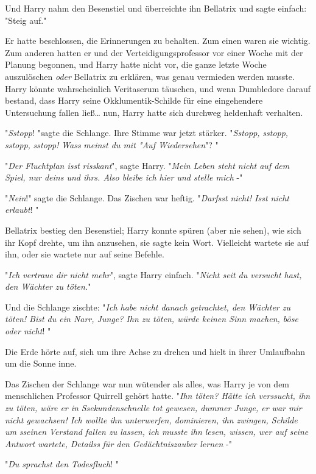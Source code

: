 {Und Harry nahm den Besenstiel und überreichte ihn Bellatrix und sagte einfach: "Steig auf."

Er hatte beschlossen, die Erinnerungen zu behalten. Zum einen waren sie wichtig. Zum anderen hatten er und der Verteidigungsprofessor vor einer Woche mit der Planung begonnen, und Harry hatte nicht vor, die ganze letzte Woche auszulöschen \emph{oder} Bellatrix zu erklären, was genau vermieden werden musste. Harry könnte wahrscheinlich Veritaserum täuschen, und wenn Dumbledore darauf bestand, dass Harry seine Okklumentik-Schilde für eine eingehendere Untersuchung fallen ließ… nun, Harry hatte sich durchweg heldenhaft verhalten.

"\emph{Sstopp}! "sagte die Schlange. Ihre Stimme war jetzt stärker. "\emph{Sstopp,} \emph{sstopp,} \emph{sstopp,} \emph{sstopp!} \emph{Wass} \emph{meinst du mit "Auf Wiedersehen}"? "

"\emph{Der Fluchtplan isst} \emph{risskant}", sagte Harry. "\emph{Mein Leben steht nicht auf dem Spiel, nur deins und ihrs. Also bleibe ich hier und stelle mich} -"

"\emph{Nein}!" sagte die Schlange. Das Zischen war heftig. "\emph{Darfsst} \emph{nicht! Isst nicht erlaubt}! "

Bellatrix bestieg den Besenstiel; Harry konnte spüren (aber nie sehen), wie sich ihr Kopf drehte, um ihn anzusehen, sie sagte kein Wort. Vielleicht wartete sie auf ihn, oder sie wartete nur auf seine Befehle.

"\emph{Ich vertraue dir nicht mehr}", sagte Harry einfach. "\emph{Nicht seit du versucht hast, den Wächter zu töten.}"

Und die Schlange zischte: "\emph{Ich habe nicht danach getrachtet, den Wächter zu töten! Bist du ein Narr, Junge? Ihn zu töten, würde keinen Sinn machen, böse oder nicht}! "

Die Erde hörte auf, sich um ihre Achse zu drehen und hielt in ihrer Umlaufbahn um die Sonne inne.

Das Zischen der Schlange war nun wütender als alles, was Harry je von dem menschlichen Professor Quirrell gehört hatte. "\emph{Ihn töten? Hätte ich verssucht, ihn zu töten, wäre er in} \emph{Ssekundenschnelle} \emph{tot gewesen, dummer Junge, er war mir nicht gewachsen! Ich wollte ihn unterwerfen, dominieren, ihn zwingen, Schilde um} \emph{sseinen} \emph{Verstand fallen zu lassen, ich musste ihn lesen, wissen, wer auf seine Antwort wartete,} \emph{Detailss} \emph{für den Gedächtniszauber lernen} -"

"\emph{Du sprachst den Todesfluch}! "

}
